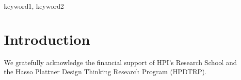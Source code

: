 \documentclass[preprint,english,10pt,nonatbib]{sigplanconf}
\begin{document}

\keywords
keyword1, keyword2

\section{Introduction}


\acks
We gratefully acknowledge the financial support of HPI's Research School and
the Hasso Plattner Design Thinking Research Program (HPDTRP).

\printbibliography

\end{document}
